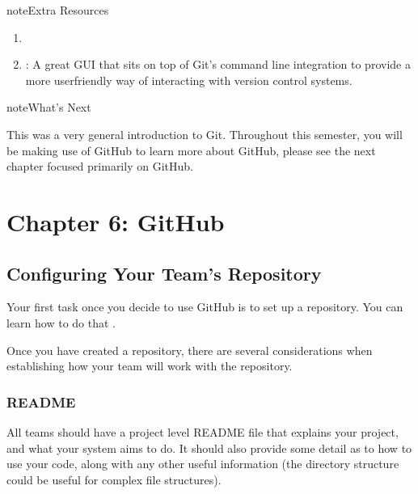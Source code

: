 \documentclass[letterpaper,10pt,english]{jupyterBook}
\begin{document}
\begin{sphinxadmonition}{note}{Extra Resources}
\begin{enumerate}
%
\item {} 
\sphinxAtStartPar
{}

\item {} 
\sphinxAtStartPar
{}: A great GUI that sits on
top of Git’s command line integration to provide a more
user\sphinxhyphen{}friendly way of interacting with version control
systems.

\end{enumerate}
\end{sphinxadmonition}

\begin{sphinxadmonition}{note}{What’s Next}

\sphinxAtStartPar
This was a very general introduction to Git. Throughout this semester,
you will be making use of GitHub \sphinxhyphen{} to learn more about GitHub, please
see the next chapter focused primarily on GitHub.
\end{sphinxadmonition}


\chapter{Chapter 6: GitHub}
\label{\detokenize{chapter_6/github:chapter-6-github}}\label{\detokenize{chapter_6/github::doc}}

\section{Configuring Your Team’s Repository}
\label{\detokenize{chapter_6/github:configuring-your-team-s-repository}}
\sphinxAtStartPar
Your first task once you decide to use GitHub is to set up a repository.
You can learn how to do that
.

\sphinxAtStartPar
Once you have created a repository, there are several considerations
when establishing how your team will work with the repository.


\subsection{README}
\label{\detokenize{chapter_6/github:readme}}
\sphinxAtStartPar
All teams should have a project level README file that explains your
project, and what your system aims to do. It should also provide some
detail as to how to use your code, along with any other useful
information (the directory structure could be useful for complex file
structures).
\end{document}
